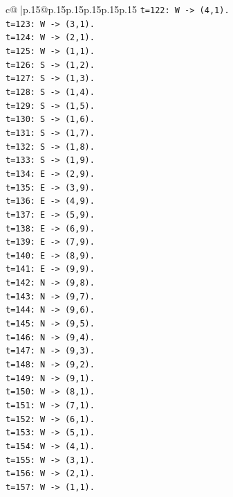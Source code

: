 \documentclass{article}
\begin{document}
{\begin{supertabular}{c@{$\;$}|p{.15\linewidth}@{}p{.15\linewidth}p{.15\linewidth}p{.15\linewidth}p{.15\linewidth}p{.15\linewidth}}
{{{\texttt{t=122: W {-}> (4,1).} \\
\texttt{t=123: W {-}> (3,1).} \\
\texttt{t=124: W {-}> (2,1).} \\
\texttt{t=125: W {-}> (1,1).} \\
\texttt{t=126: S {-}> (1,2).} \\
\texttt{t=127: S {-}> (1,3).} \\
\texttt{t=128: S {-}> (1,4).} \\
\texttt{t=129: S {-}> (1,5).} \\
\texttt{t=130: S {-}> (1,6).} \\
\texttt{t=131: S {-}> (1,7).} \\
\texttt{t=132: S {-}> (1,8).} \\
\texttt{t=133: S {-}> (1,9).} \\
\texttt{t=134: E {-}> (2,9).} \\
\texttt{t=135: E {-}> (3,9).} \\
\texttt{t=136: E {-}> (4,9).} \\
\texttt{t=137: E {-}> (5,9).} \\
\texttt{t=138: E {-}> (6,9).} \\
\texttt{t=139: E {-}> (7,9).} \\
\texttt{t=140: E {-}> (8,9).} \\
\texttt{t=141: E {-}> (9,9).} \\
\texttt{t=142: N {-}> (9,8).} \\
\texttt{t=143: N {-}> (9,7).} \\
\texttt{t=144: N {-}> (9,6).} \\
\texttt{t=145: N {-}> (9,5).} \\
\texttt{t=146: N {-}> (9,4).} \\
\texttt{t=147: N {-}> (9,3).} \\
\texttt{t=148: N {-}> (9,2).} \\
\texttt{t=149: N {-}> (9,1).} \\
\texttt{t=150: W {-}> (8,1).} \\
\texttt{t=151: W {-}> (7,1).} \\
\texttt{t=152: W {-}> (6,1).} \\
\texttt{t=153: W {-}> (5,1).} \\
\texttt{t=154: W {-}> (4,1).} \\
\texttt{t=155: W {-}> (3,1).} \\
\texttt{t=156: W {-}> (2,1).} \\
\texttt{t=157: W {-}> (1,1).} \\
}}}
\end{supertabular}}
\end{document}
